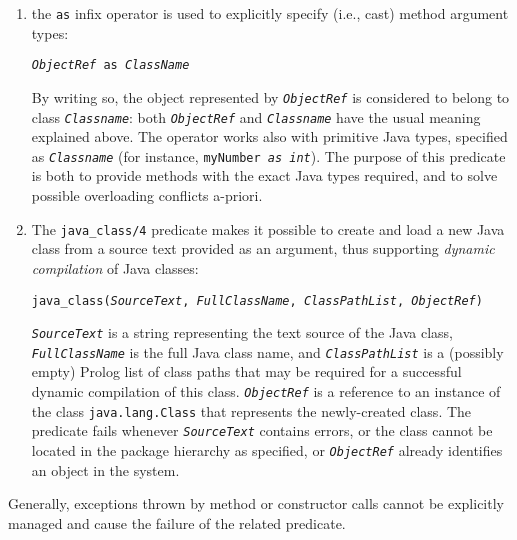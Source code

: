 \begin{enumerate}
  \item the \texttt{as} infix operator is used to explicitly specify (i.e., cast)
        method argument types:
        \begin{center}
        \texttt{\textit{ObjectRef} as \textit{ClassName}}
        \end{center}
        By writing so, the object represented by \texttt{\textit{ObjectRef}} is
        considered to belong to class \texttt{\textit{Classname}}: both
        \texttt{\textit{ObjectRef}} and \texttt{\textit{Classname}} have
        the usual meaning explained above.
        The operator works also with primitive Java types, specified
        as \texttt{\textit{Classname}} (for instance, \texttt{myNumber \textit{as int}}).
        The purpose of this predicate is both to provide methods with the
        exact Java types required, and to solve possible overloading conflicts
        a-priori.

  \item The \texttt{java\_class/4} predicate makes it possible
        to create and load a new Java class from a source text provided as an
        argument, thus supporting \textit{dynamic compilation} of Java
        classes:
        \begin{center}
        \texttt{java\_class(\textit{SourceText},
                            \textit{FullClassName},
                            \textit{ClassPathList},
                            \textit{ObjectRef})}
        \end{center}
        \texttt{\textit{SourceText}} is a string representing the
        text source of the Java class, \texttt{\textit{FullClassName}}
        is the full Java class name, and \texttt{\textit{ClassPathList}}
        is a (possibly empty) Prolog list of class paths that may
        be required for a successful dynamic compilation
        of this class.
        \texttt{\textit{ObjectRef}} is a reference to an instance of the
        class \texttt{java.lang.Class} that represents the newly-created class.
        The predicate fails whenever \texttt{\textit{SourceText}} contains errors,
        or the class cannot be located in the package hierarchy
        as specified, or \texttt{\textit{ObjectRef}} already identifies an object
        in the system.

\end{enumerate}
%
%
\noindent Generally, exceptions thrown by method or constructor
calls cannot be explicitly managed and cause the failure of the
related predicate.
%

